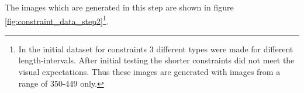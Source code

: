 The images which are generated in this step are shown in figure \ref{fig:constraint_data_step2}\footnote{In the initial dataset for constraints 3 different types were made for different length-intervals. After initial testing the shorter constraints did not meet the visual expectations. Thus these images are generated with images from a range of 350-449 only.}.

\begin{figure}
    \centering
    \label{fig:constraint_data_step2}
    \begin{subfigure}[b]{0.19\textwidth}
    \end{subfigure}
    \begin{subfigure}[b]{0.19\textwidth}

\end{subfigure}
\end{figure}
